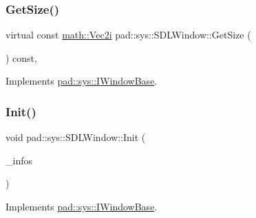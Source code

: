 \mbox{\label{classpad_1_1sys_1_1_s_d_l_window_a4b39d8767776e1fe6f613ad3fe7d7b29}} 
\subsubsection{\texorpdfstring{Get\+Size()}{GetSize()}}
{\footnotesize\ttfamily virtual const \mbox{\hyperlink{namespacepad_1_1math_a808a631a6bccd994f9589d7fb86bad41}{math\+::\+Vec2i}} pad\+::sys\+::\+S\+D\+L\+Window\+::\+Get\+Size (\begin{DoxyParamCaption}{ }\end{DoxyParamCaption}) const\hspace{0.3cm}{\ttfamily [inline]}, {\ttfamily [virtual]}}



Implements \mbox{\hyperlink{classpad_1_1sys_1_1_i_window_base_acf3540e89da05cc490cf981f196ad771}{pad\+::sys\+::\+I\+Window\+Base}}.

\mbox{\label{classpad_1_1sys_1_1_s_d_l_window_a7749e49f614ac33a95f1ef4ffed853e7}} 
\subsubsection{\texorpdfstring{Init()}{Init()}}
{\footnotesize\ttfamily void pad\+::sys\+::\+S\+D\+L\+Window\+::\+Init (\begin{DoxyParamCaption}\item[{const \mbox{\hyperlink{structpad_1_1sys_1_1_window_settings}{Window\+Settings}} \&}]{\+\_\+infos }\end{DoxyParamCaption})\hspace{0.3cm}{\ttfamily [virtual]}}



Implements \mbox{\hyperlink{classpad_1_1sys_1_1_i_window_base_aee66a6eacff6126f4106a8e725bcbf1f}{pad\+::sys\+::\+I\+Window\+Base}}.

\mbox{\label{classpad_1_1sys_1_1_s_d_l_window_ae76d9066f3c36e8b949b6c211be0affd}} 
